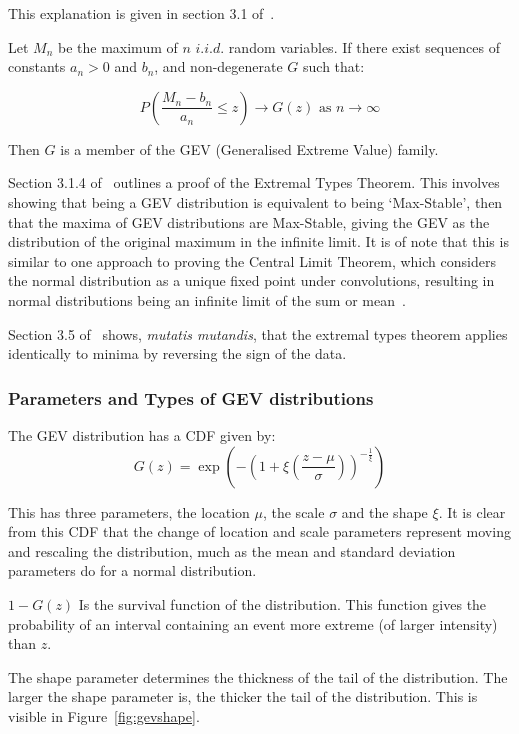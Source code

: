 This explanation is given in section 3.1 of~\cite{Coles_2001}.

Let $M_n$ be the maximum of $n$ $i.i.d.$ random variables.
If there exist sequences of constants $a_n > 0$ and $b_n$, and non-degenerate $G$ such that:

\[ P\left( \frac{M_n - b_n}{a_n}  \leq z \right) \rightarrow G(z) \text{ as } n \rightarrow \infty \]

Then $G$ is a member of the GEV (Generalised Extreme Value) family.

Section 3.1.4 of~\cite{Coles_2001} outlines a proof of the Extremal Types Theorem.
This involves showing that being a GEV distribution is equivalent to being `Max-Stable',
    then that the maxima of GEV distributions are Max-Stable,
    giving the GEV as the distribution of the original maximum in the infinite limit.
It is of note that this is similar to one approach to proving the Central Limit Theorem,
    which considers the normal distribution as a unique fixed point under convolutions,
    resulting in normal distributions being an infinite limit of the sum or mean~\cite{Hamedani_Walter_1984}.

Section 3.5 of~\cite{Coles_2001} shows, \textit{mutatis mutandis},
    that the extremal types theorem applies identically to minima by reversing the sign of the data.

\subsubsection{Parameters and Types of GEV distributions}

The GEV distribution has a CDF given by:
\begin{equation}\label{eq:gevcdf}
    G(z) = \exp \left( - \left( 1 + \xi \left( \frac{z-\mu}{\sigma} \right)  \right)^{-\frac{1}{\xi}} \right)
\end{equation}

This has three parameters, the location $\mu$, the scale $\sigma$ and the shape $\xi$.
It is clear from this CDF that the change of location and scale parameters represent moving and rescaling the distribution,
    much as the mean and standard deviation parameters do for a normal distribution.

$1-G(z)$ Is the survival function of the distribution.
This function gives the probability of an interval containing an event more extreme (of larger intensity) than $z$.

The shape parameter determines the thickness of the tail of the distribution.
The larger the shape parameter is, the thicker the tail of the distribution.
This is visible in Figure~\ref{fig:gevshape}.

